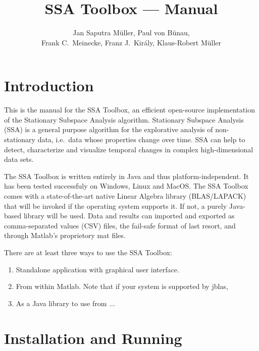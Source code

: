 \documentclass{article}
\newcommand{\1}{\ensuremath{\mathds{1}}}
\newcommand{\0}{\ensuremath{0}}
\begin{document}
\title{SSA Toolbox  --- Manual}
\author{Jan Saputra M\"uller, Paul von B\"unau, \\ Frank C.~Meinecke, Franz J.~Kir\'{a}ly, Klaus-Robert M\"uller}

\maketitle

\tableofcontents

\newpage

\section{Introduction}

This is the manual for the SSA Toolbox, an efficient open-source implementation of the 
Stationary Subspace Analysis \cite{PRL:SSA:2009} algorithm. Stationary Subspace Analysis (SSA)
is a general purpose algorithm for the explorative analysis of non-stationary data, i.e.~data
whose properties change over time. SSA can help to detect, characterize and visualize temporal
changes in complex high-dimensional data sets.

The SSA Toolbox is written entirely in Java and thus platform-independent. It has been tested
successfuly on Windows, Linux and MacOS. The SSA Toolbox comes with a state-of-the-art native 
Linear Algebra library (BLAS/LAPACK) that will be invoked if the operating system supports 
it. If not, a purely Java-based library will be used. Data and results can imported and
exported as comma-separated values (CSV) files, the fail-safe format of last resort, and through
Matlab's proprietory mat files. 
 
There are at least three ways to use the SSA Toolbox:
\begin{enumerate}
	\item Standalone application with graphical user interface. 
	
	\item From within Matlab. Note that if your system is supported by jblas, 

	\item As a Java library to use from ...
\end{enumerate}


\section{Installation and Running}
\label{sec:install_run}
\end{document}
